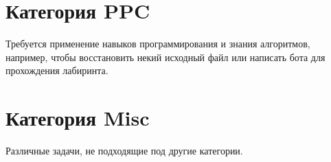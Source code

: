 \section{Категория PPC}

Требуется применение навыков программирования и знания алгоритмов, например, чтобы восстановить некий исходный файл или написать бота для прохождения лабиринта.






\section{Категория Misc}

Различные задачи, не подходящие под другие категории.

